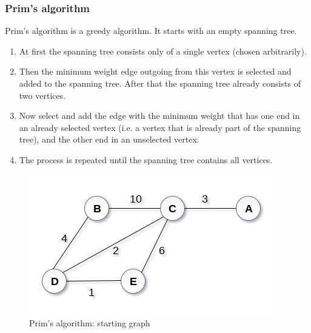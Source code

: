 \documentclass[a4paper,11pt]{book}
\begin{document}
% 
% 
% 
% 
% 
% 
% 
% 

\subsubsection{Prim's algorithm}

\noindent Prim's algorithm is a greedy algorithm. It starts with an empty spanning tree.
\begin{enumerate}
    \item At first the spanning tree consists only of a single vertex (chosen arbitrarily). 
    \item Then the minimum weight edge outgoing from this vertex is selected and added to the spanning tree. After that the spanning tree already consists of two vertices. 
    \item Now select and add the edge with the minimum weight that has one end in an already selected vertex (i.e. a vertex that is already part of the spanning tree), and the other end in an unselected vertex. 
    \item The process is repeated until the spanning tree contains all vertices.
\end{enumerate}

\begin{figure}[ht]
	\centering
	\includegraphics[scale=0.45]{code/sort/pic/prim1.png}
	\caption{Prim's algorithm: starting graph}
	\label{fig:prim1}
\end{figure}
\end{document}
